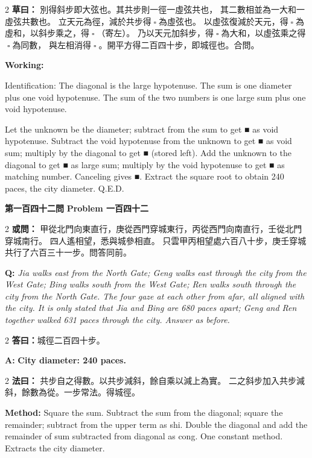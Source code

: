 \documentclass[11pt,a4paper]{article}
\let\origsquare\square
\renewcommand{\square}{\ensuremath{\origsquare}}%
\newcommand{\wen}[1]{%
  \par\vspace{0.5em}%
  \noindent\textcolor{problemcolor}{\textbf{第#1問}}%
  \hfill\textcolor{problemcolor}{\textbf{Problem #1}}\par\nopagebreak%
  \vspace{0.3em}%
}
\newcommand{\owen}[1]{%
  \noindent\textcolor{problemcolor}{\textbf{或問：}}{\tradfont #1}\par\nopagebreak%
}
\newcommand{\oweneng}[1]{%
  \noindent\textcolor{engcolor}{\textbf{Q: }}{\itshape #1}\par\nopagebreak%
}
\newcommand{\fayue}[1]{%
  \noindent\textcolor{methodcolor}{\textbf{法曰：}}{\tradfont #1}\par\nopagebreak%
}
\newcommand{\fayueeng}[1]{%
  \noindent\textcolor{engcolor}{\textbf{Method: }}{#1}\par\nopagebreak%
}
\newcommand{\tsaoyue}[1]{%
  \noindent\textcolor{workcolor}{\textbf{草曰：}}{\tradfont #1}\par%
}
\newcommand{\tsaoyueeng}[1]{%
  \noindent\textcolor{engcolor}{\textbf{Working: }}{\small #1}\par%
}
\newcommand{\dayue}[1]{%
  \noindent\textcolor{anscolor}{\textbf{答曰：}}{\tradfont #1}\par\nopagebreak%
}
\newcommand{\dayueeng}[1]{%
  \noindent\textcolor{engcolor}{\textbf{A: }}{\bfseries #1}\par\nopagebreak%
}
\begin{document}
\begin{paracol}{2}
\tsaoyue{%
別得斜步即大弦也。其共步則一徑一虛弦共也，
其二數相並為一大和一虛弦共數也。
立天元為徑，減於共步得$ \; \square \; $為虛弦也。
以虛弦復減於天元，得$ \; \square \; $為虛和，以斜步乘之，得$ \; \square \; $（寄左）。
乃以天元加斜步，得$ \; \square \; $為大和，以虛弦乘之得$ \; \square \; $為同數，
與左相消得$ \; \square \; $。開平方得二百四十步，即城徑也。合問。}
\switchcolumn
\tsaoyueeng{%
Identification: The diagonal is the large hypotenuse. The sum is one diameter plus one void hypotenuse. The sum of the two numbers is one large sum plus one void hypotenuse.

Let the unknown be the diameter; subtract from the sum to get ■ as void hypotenuse. Subtract the void hypotenuse from the unknown to get ■ as void sum; multiply by the diagonal to get ■ (stored left). Add the unknown to the diagonal to get ■ as large sum; multiply by the void hypotenuse to get ■ as matching number. Canceling gives ■. Extract the square root to obtain 240 paces, the city diameter. Q.E.D.}
\end{paracol}

\vspace{0.5cm}

\wen{一百四十二}

\begin{paracol}{2}
\owen{%
甲從北門向東直行，庚從西門穿城東行，丙從西門向南直行，壬從北門穿城南行。
四人遙相望，悉與城參相直。
只雲甲丙相望處六百八十步，庚壬穿城共行了六百三十一步。問答同前。}
\switchcolumn
\oweneng{%
Jia walks east from the North Gate; Geng walks east through the city from the West Gate; Bing walks south from the West Gate; Ren walks south through the city from the North Gate. The four gaze at each other from afar, all aligned with the city. It is only stated that Jia and Bing are 680 paces apart; Geng and Ren together walked 631 paces through the city. Answer as before.}
\end{paracol}

\begin{paracol}{2}
\dayue{城徑二百四十步。}
\switchcolumn
\dayueeng{City diameter: 240 paces.}
\end{paracol}

\begin{paracol}{2}
\fayue{%
共步自之得數。以共步減斜，餘自乘以減上為實。
二之斜步加入共步減斜，餘數為從。一步常法。得城徑。}
\switchcolumn
\fayueeng{%
Square the sum. Subtract the sum from the diagonal; square the remainder; subtract from the upper term as shi. Double the diagonal and add the remainder of sum subtracted from diagonal as cong. One constant method. Extracts the city diameter.}
\end{paracol}
\end{document}
